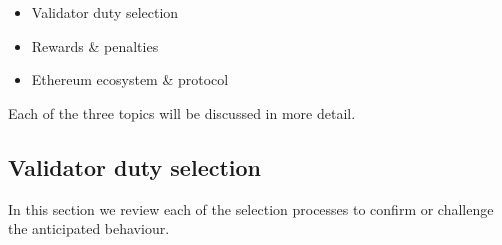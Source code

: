 \documentclass[UTF8]{article}
\begin{document}
\begin{itemize}
\item Validator duty selection
\item Rewards \& penalties
\item Ethereum ecosystem \& protocol
\end{itemize}

Each of the three topics will be discussed in more detail. 

\subsection{Validator duty selection}
In this section we review each of the selection processes to confirm or challenge the anticipated behaviour.
\end{document}
